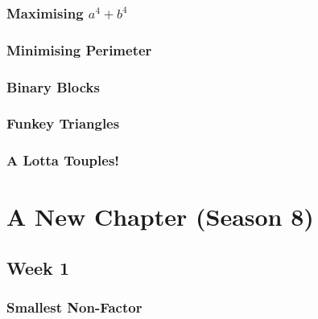 \documentclass[titlepage=true]{scrartcl}
\begin{document}
        \subsubsection{Maximising \(a^4+b^4\)}
            \label{7.2.3}  
            
        \newpage    

        \subsubsection{Minimising Perimeter}
            \label{7.2.4}
            
        \newpage 

        \subsubsection{Binary Blocks}
            \label{7.2.5}  
            
        \newpage

        \subsubsection{Funkey Triangles}
            \label{7.2.6}  
            
        \newpage

        \subsubsection{A Lotta Touples!}
            \label{7.2.7}  
            
        \newpage
        
\section{A New Chapter (Season 8)}
        
    \subsection{Week 1}

        \subsubsection{Smallest Non-Factor}
            \label{8.1.1}
            
        \newpage
        
\end{document}
